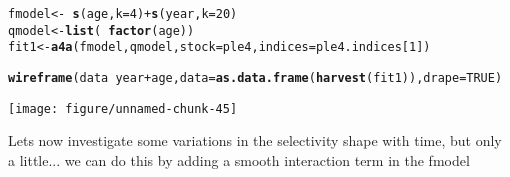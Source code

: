 \documentclass[a4paper,english,10pt]{article}\usepackage[]{graphicx}\usepackage[]{color}
\makeatletter
\def\maxwidth{ %
  \ifdim\Gin@nat@width>\linewidth
    \linewidth
  \else
    \Gin@nat@width
  \fi
}
\newcommand{\hlnum}[1]{\textcolor[rgb]{0.686,0.059,0.569}{#1}}%
\newcommand{\hlopt}[1]{\textcolor[rgb]{0,0,0}{#1}}%
\newcommand{\hlstd}[1]{\textcolor[rgb]{0.345,0.345,0.345}{#1}}%
\newcommand{\hlkwb}[1]{\textcolor[rgb]{0.69,0.353,0.396}{#1}}%
\newcommand{\hlkwc}[1]{\textcolor[rgb]{0.333,0.667,0.333}{#1}}%
\newcommand{\hlkwd}[1]{\textcolor[rgb]{0.737,0.353,0.396}{\textbf{#1}}}%
\newenvironment{kframe}{%
 \def\at@end@of@kframe{}%
 \ifinner\ifhmode%
  \def\at@end@of@kframe{\end{minipage}}%
  \begin{minipage}{\columnwidth}%
 \fi\fi%
 \def\FrameCommand##1{\hskip\@totalleftmargin \hskip-\fboxsep
 \colorbox{shadecolor}{##1}\hskip-\fboxsep
     \hskip-\linewidth \hskip-\@totalleftmargin \hskip\columnwidth}%
 \MakeFramed {\advance\hsize-\width
   \@totalleftmargin\z@ \linewidth\hsize
   \@setminipage}}%
 {\par\unskip\endMakeFramed%
 \at@end@of@kframe}
\newenvironment{knitrout}{}{} %
\makeatother
\begin{document}
\begin{knitrout}
\color{fgcolor}\begin{kframe}
\begin{alltt}
\hlstd{fmodel} \hlkwb{<-} \hlopt{~}\hlkwd{s}\hlstd{(age,} \hlkwc{k} \hlstd{=} \hlnum{4}\hlstd{)} \hlopt{+} \hlkwd{s}\hlstd{(year,} \hlkwc{k} \hlstd{=} \hlnum{20}\hlstd{)}
\hlstd{qmodel} \hlkwb{<-} \hlkwd{list}\hlstd{(}\hlopt{~}\hlkwd{factor}\hlstd{(age))}
\hlstd{fit1} \hlkwb{<-} \hlkwd{a4a}\hlstd{(fmodel, qmodel,} \hlkwc{stock} \hlstd{= ple4,} \hlkwc{indices} \hlstd{= ple4.indices[}\hlnum{1}\hlstd{])}
\end{alltt}


{\ttfamily\noindent\itshape\color{messagecolor}{\#\# Note: The following observations are treated as being missing at random:\\\#\# 	\ \ \ \ fleet year age\\\#\# 	 BTS-Isis 1997\ \  1\\\#\# 	 BTS-Isis 1997\ \  2\\\#\#\ \ \ \ \ \  Predictions will be made for missing observations.}}\begin{alltt}
\hlkwd{wireframe}\hlstd{(data} \hlopt{~} \hlstd{year} \hlopt{+} \hlstd{age,} \hlkwc{data} \hlstd{=} \hlkwd{as.data.frame}\hlstd{(}\hlkwd{harvest}\hlstd{(fit1)),} \hlkwc{drape} \hlstd{=} \hlnum{TRUE}\hlstd{)}
\end{alltt}
\end{kframe}
\texttt{[image: figure/unnamed-chunk-45]} 

\end{knitrout}


Lets now investigate some variations in the selectivity shape with time, but only a little... we can do this by adding a smooth interaction term in the fmodel
\end{document}
